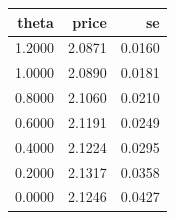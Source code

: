 \begin{tabular}{rrr}
\toprule
theta & price & se \\
\midrule
1.2000 & 2.0871 & 0.0160 \\
1.0000 & 2.0890 & 0.0181 \\
0.8000 & 2.1060 & 0.0210 \\
0.6000 & 2.1191 & 0.0249 \\
0.4000 & 2.1224 & 0.0295 \\
0.2000 & 2.1317 & 0.0358 \\
0.0000 & 2.1246 & 0.0427 \\
\bottomrule
\end{tabular}
